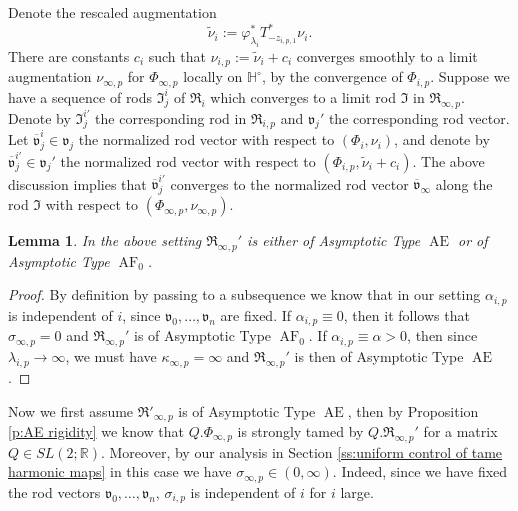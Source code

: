 \documentclass[a4paper,11pt]{amsart}
\newtheorem{lemma}[theorem]{Lemma}
\theoremstyle{definition}
\numberwithin{equation}{section}
\newcommand{\dH}{\mathbb{H}}
\newcommand{\R}{\mathbb{R}}
\newcommand{\mv} {\mathfrak v}
\newcommand{\mI} {\mathfrak I}
\newcommand{\mR} {\mathfrak R}
\DeclareMathOperator{\Ae}{AE}
\DeclareMathOperator{\AF}{AF}
\begin{document}
Denote the rescaled augmentation 
\begin{equation}\label{eq:define tilde nu}
    \widetilde\nu_i:=\varphi_{\lambda_i}^*T_{-{z}_{i, p,1}}^*\nu_{i}.
\end{equation} 
There are constants $c_i$ such that $\nu_{i,p}:=\widetilde\nu_i+c_i$ converges smoothly to a limit augmentation $\nu_{\infty, p}$ for $\Phi_{\infty, p}$  locally on $\dH^\circ$, by the convergence of $\Phi_{i,p}$. Suppose we have a sequence of rods $\mI^i_j$ of $\mR_i$ which converges to a limit rod $\mI$ in $\mR_{\infty, p}$. Denote by $\mI^{i'}_j$ the corresponding rod in $\mR_{i, p}$ and $\mv_j'$ the corresponding rod vector. Let $\overline{\mv}_j^i\in \mv_j$ the normalized rod vector with respect to $(\Phi_i, \nu_i)$, and denote by $\overline{\mv}_{j}^{i'}\in \mv_{j}'$ the normalized rod vector with respect to $(\Phi_{i,p},\widetilde{\nu}_i+c_i)$. The above discussion implies that $\overline{\mv}_j^{i'}$ converges to the normalized rod vector $\overline{\mv}_\infty$ along the rod $\mI$ with respect to $(\Phi_{\infty, p}, \nu_{\infty, p})$.

\begin{lemma}
   In the above setting $\mR_{\infty, p}'$ is either of  Asymptotic Type  $\Ae$ or of Asymptotic Type $\AF_0$.
\end{lemma}
\begin{proof}
    By definition by passing to a subsequence we know that in our setting $\alpha_{i, p}$ is independent of $i$, since $\mv_0,\ldots,\mv_n$ are fixed. If $\alpha_{i, p}\equiv0$, then it follows that $\sigma_{\infty, p}=0$ and $\mR_{\infty, p}'$ is of Asymptotic Type $\AF_0$. If $\alpha_{i, p}\equiv \alpha>0$, then since $\lambda_{i, p}\rightarrow\infty$, we must have $\kappa_{\infty ,p}=\infty$ and $\mR_{\infty, p}'$ is then of  Asymptotic Type  $\Ae$.
\end{proof}


Now  we first assume $\mR'_{\infty,p}$ is of  Asymptotic Type  $\Ae$, then by Proposition \ref{p:AE rigidity} we know  that $Q.\Phi_{\infty, p}$ is strongly tamed by $Q.\mR_{\infty, p}'$ for a matrix $Q\in SL(2; \R)$. Moreover, by our analysis in Section \ref{ss:uniform control of tame harmonic maps} in this case we have $\sigma_{\infty, p}\in (0, \infty)$. Indeed, since we have fixed the rod vectors $\mv_0,\ldots,\mv_n$, $\sigma_{i, p}$ is independent of $i$ for $i$ large. 
\end{document}
